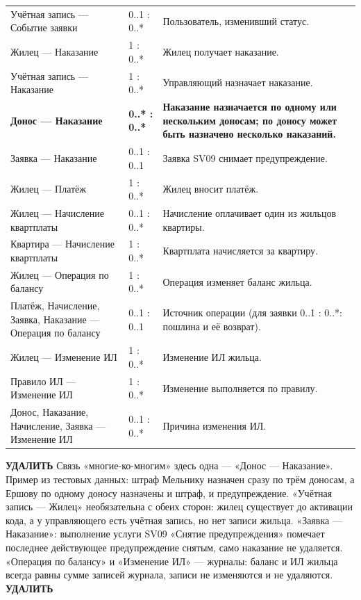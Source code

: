 \documentclass[12pt,a4paper]{article}
\begin{document}
\begin{longtable}{L{49.0mm} L{23.5mm} L{84.3mm}}
Учётная запись — Событие заявки & 0..1 : 0..* & Пользователь, изменивший статус. \\
Жилец — Наказание & 1 : 0..* & Жилец получает наказание. \\
Учётная запись — Наказание & 1 : 0..* & Управляющий назначает наказание. \\
\textbf{Донос — Наказание} & \textbf{0..* : 0..*} & \textbf{Наказание назначается по одному или нескольким доносам; по доносу может быть назначено несколько наказаний.} \\
Заявка — Наказание & 0..1 : 0..1 & Заявка SV09 снимает предупреждение. \\
Жилец — Платёж & 1 : 0..* & Жилец вносит платёж. \\
Жилец — Начисление квартплаты & 0..1 : 0..* & Начисление оплачивает один из жильцов квартиры. \\
Квартира — Начисление квартплаты & 1 : 0..* & Квартплата начисляется за квартиру. \\
Жилец — Операция по балансу & 1 : 0..* & Операция изменяет баланс жильца. \\
Платёж, Начисление, Заявка, Наказание — Операция по балансу & 0..1 : 0..1 & Источник операции (для заявки 0..1 : 0..*: пошлина и её возврат). \\
Жилец — Изменение ИЛ & 1 : 0..* & Изменение ИЛ жильца. \\
Правило ИЛ — Изменение ИЛ & 1 : 0..* & Изменение выполняется по правилу. \\
Донос, Наказание, Начисление, Заявка — Изменение ИЛ & 0..1 : 0..* & Причина изменения ИЛ. \\
\end{longtable}
\textbf{УДАЛИТЬ} Связь «многие-ко-многим» здесь одна --- «Донос — Наказание». Пример из тестовых данных: штраф Мельнику назначен сразу по трём доносам, а Ершову по одному доносу назначены и штраф, и предупреждение. «Учётная запись — Жилец» необязательна с обеих сторон: жилец существует до активации кода, а у управляющего есть учётная запись, но нет записи жильца. «Заявка — Наказание»: выполнение услуги SV09 «Снятие предупреждения» помечает последнее действующее предупреждение снятым, само наказание не удаляется. «Операция по балансу» и «Изменение ИЛ» --- журналы: баланс и ИЛ жильца всегда равны сумме записей журнала, записи не изменяются и не удаляются. \textbf{УДАЛИТЬ}
\end{document}
